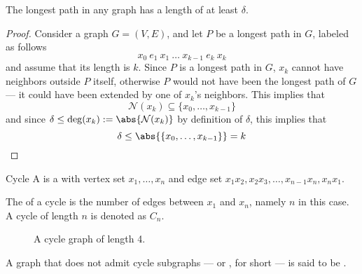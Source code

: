 \documentclass[a4paper, 12pt]{report}
\begin{document}
    \begin{framedprop}[label={longest path len}]{}
        The longest path in any graph has a length of at least $\delta$.
    \end{framedprop}
    
    \begin{proof}
        Consider a graph $G = (V, E)$, and let $P$ be a longest path in $G$, labeled as follows $$x_0 \ e_1 \ x_1 \ \ldots \ x_{k - 1} \ e_k \ x_k$$ and assume that its length is $k$. Since $P$ is a longest path in $G$, $x_k$ cannot have neighbors outside $P$ itself, otherwise $P$ would not have been the longest path of $G$ --- it could have been extended by one of $x_k$'s neighbors. This implies that $$\mathcal N(x_k) \subseteq \{x_0, \ldots, x_{k - 1}\}$$ and since $\delta \le \deg(x_k) := \abs{\mathcal N(x_k)}$ by definition of $\delta$, this implies that $$\delta \le \abs{\{x_0, \ldots, x_{k - 1}\}} = k$$
    \end{proof}

    \begin{frameddefn}{Cycle}
        A  is a  with vertex set $x_1, \ldots, x_n$ and edge set $x_1x_2, x_2x_3, \ldots, x_{n- 1}x_n, x_nx_1$.

        The  of a cycle is the number of edges between $x_1$ and $x_n$, namely $n$ in this case. A cycle of length $n$ is denoted as $C_n$.
    \end{frameddefn}

        \begin{figure}[H]
        \centering
        \caption{A cycle graph of length 4.}
    \end{figure}

    A graph that does not admit cycle subgraphs --- or , for short --- is said to be .
\end{document}
